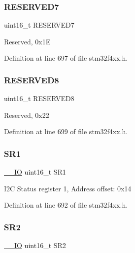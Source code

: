 \subsubsection{\texorpdfstring{R\+E\+S\+E\+R\+V\+E\+D7}{RESERVED7}}
{\footnotesize\ttfamily uint16\+\_\+t R\+E\+S\+E\+R\+V\+E\+D7}

Reserved, 0x1E 

Definition at line 697 of file stm32f4xx.\+h.

\mbox{\label{struct_i2_c___type_def_afc22764fbf9ee7ce28174d65d0260f18}} 
\subsubsection{\texorpdfstring{R\+E\+S\+E\+R\+V\+E\+D8}{RESERVED8}}
{\footnotesize\ttfamily uint16\+\_\+t R\+E\+S\+E\+R\+V\+E\+D8}

Reserved, 0x22 

Definition at line 699 of file stm32f4xx.\+h.

\mbox{\label{struct_i2_c___type_def_a1e79a16729e8d1032d9fe552d50dce41}} 
\subsubsection{\texorpdfstring{S\+R1}{SR1}}
{\footnotesize\ttfamily \hyperlink{group___c_m_s_i_s__core__definitions_gaec43007d9998a0a0e01faede4133d6be}{\+\_\+\+\_\+\+IO} uint16\+\_\+t S\+R1}

I2C Status register 1, Address offset\+: 0x14 

Definition at line 692 of file stm32f4xx.\+h.

\mbox{\label{struct_i2_c___type_def_a682809d3f8187cdefb9d615e89b67e65}} 
\subsubsection{\texorpdfstring{S\+R2}{SR2}}
{\footnotesize\ttfamily \hyperlink{group___c_m_s_i_s__core__definitions_gaec43007d9998a0a0e01faede4133d6be}{\+\_\+\+\_\+\+IO} uint16\+\_\+t S\+R2}

